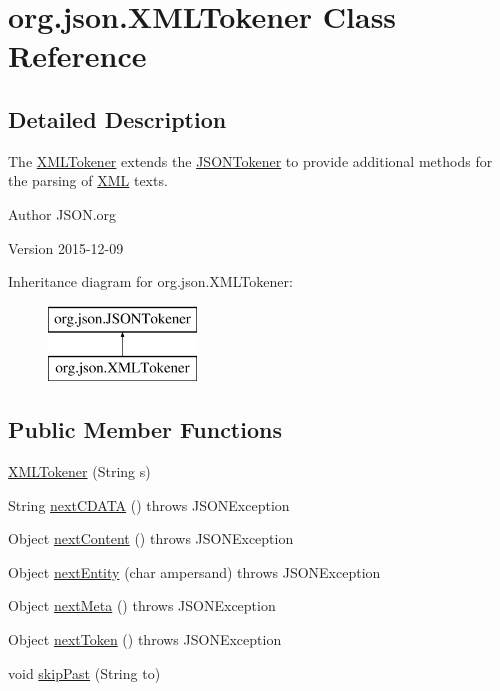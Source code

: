 \hypertarget{classorg_1_1json_1_1XMLTokener}{\section{org.\-json.\-X\-M\-L\-Tokener Class Reference}
\label{classorg_1_1json_1_1XMLTokener}
}


\subsection{Detailed Description}
The \hyperlink{classorg_1_1json_1_1XMLTokener}{X\-M\-L\-Tokener} extends the \hyperlink{classorg_1_1json_1_1JSONTokener}{J\-S\-O\-N\-Tokener} to provide additional methods for the parsing of \hyperlink{classorg_1_1json_1_1XML}{X\-M\-L} texts. \begin{DoxyAuthor}{Author}
J\-S\-O\-N.\-org 
\end{DoxyAuthor}
\begin{DoxyVersion}{Version}
2015-\/12-\/09 
\end{DoxyVersion}
Inheritance diagram for org.\-json.\-X\-M\-L\-Tokener\-:\begin{figure}[H]
\begin{center}
\leavevmode
\includegraphics[height=2.000000cm]{classorg_1_1json_1_1XMLTokener}
\end{center}
\end{figure}
\subsection*{Public Member Functions}
\begin{DoxyCompactItemize}
\item 
\hyperlink{classorg_1_1json_1_1XMLTokener_a43ba71b6376938f07b4781fb6c66a7ac}{X\-M\-L\-Tokener} (String s)
\item 
String \hyperlink{classorg_1_1json_1_1XMLTokener_a0f321a2fa10eb19c08d05cf17cfa4e54}{next\-C\-D\-A\-T\-A} ()  throws J\-S\-O\-N\-Exception 
\item 
Object \hyperlink{classorg_1_1json_1_1XMLTokener_a356e0c4bb50197720b5eb638783b632c}{next\-Content} ()  throws J\-S\-O\-N\-Exception 
\item 
Object \hyperlink{classorg_1_1json_1_1XMLTokener_aa67ac8eb561a438290fad648fd295fd5}{next\-Entity} (char ampersand)  throws J\-S\-O\-N\-Exception 
\item 
Object \hyperlink{classorg_1_1json_1_1XMLTokener_aa36d5f6baf25f85fef0468fadcc3b8ff}{next\-Meta} ()  throws J\-S\-O\-N\-Exception 
\item 
Object \hyperlink{classorg_1_1json_1_1XMLTokener_a654e38e5abe2ad37e10f968613dab875}{next\-Token} ()  throws J\-S\-O\-N\-Exception 
\item 
void \hyperlink{classorg_1_1json_1_1XMLTokener_ae07153a6cfc7008a20c9d641652d6dea}{skip\-Past} (String to)
\end{DoxyCompactItemize}
